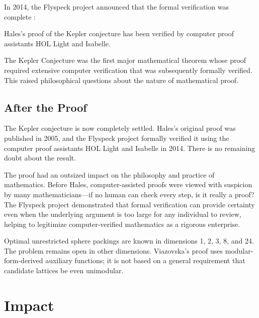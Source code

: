 In 2014, the Flyspeck project announced that the formal verification was complete \cite{hales2017}:

\begin{theorem}
Hales's proof of the Kepler conjecture has been verified by computer proof assistants HOL Light and Isabelle.
\end{theorem}

\begin{highlightbox}
The Kepler Conjecture was the first major mathematical theorem whose proof required extensive computer verification that was subsequently formally verified. This raised philosophical questions about the nature of mathematical proof.
\end{highlightbox}

\subsection{After the Proof}

The Kepler conjecture is now completely settled. Hales's original proof was published in 2005, and the Flyspeck project formally verified it using the computer proof assistants HOL Light and Isabelle in 2014. There is no remaining doubt about the result.

The proof had an outsized impact on the philosophy and practice of mathematics. Before Hales, computer-assisted proofs were viewed with suspicion by many mathematicians---if no human can check every step, is it really a proof? The Flyspeck project demonstrated that formal verification can provide certainty even when the underlying argument is too large for any individual to review, helping to legitimize computer-verified mathematics as a rigorous enterprise.

Optimal unrestricted sphere packings are known in dimensions 1, 2, 3, 8, and 24. The problem remains open in other dimensions. Viazovska's proof uses modular-form-derived auxiliary functions; it is not based on a general requirement that candidate lattices be even unimodular.

\section{Impact}

